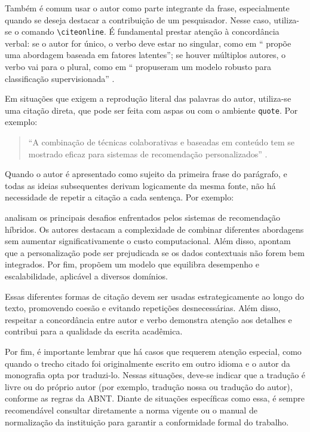 Também é comum usar o autor como parte integrante da frase, especialmente quando se deseja destacar a contribuição de um pesquisador. Nesse caso, utiliza-se o comando \verb|\citeonline|. É fundamental prestar atenção à concordância verbal: se o autor for único, o verbo deve estar no singular, como em `` propõe uma abordagem baseada em fatores latentes''; se houver múltiplos autores, o verbo vai para o plural, como em `` propuseram um modelo robusto para classificação supervisionada'' .

Em situações que exigem a reprodução literal das palavras do autor, utiliza-se uma citação direta, que pode ser feita com aspas ou com o ambiente \verb|quote|. Por exemplo:

\begin{quote}
``A combinação de técnicas colaborativas e baseadas em conteúdo tem se mostrado eficaz para sistemas de recomendação personalizados'' \cite{braida2015transforming}.
\end{quote}

Quando o autor é apresentado como sujeito da primeira frase do parágrafo, e todas as ideias subsequentes derivam logicamente da mesma fonte, não há necessidade de repetir a citação a cada sentença. Por exemplo:

 analisam os principais desafios enfrentados pelos sistemas de recomendação híbridos. Os autores destacam a complexidade de combinar diferentes abordagens sem aumentar significativamente o custo computacional. Além disso, apontam que a personalização pode ser prejudicada se os dados contextuais não forem bem integrados. Por fim, propõem um modelo que equilibra desempenho e escalabilidade, aplicável a diversos domínios.

Essas diferentes formas de citação devem ser usadas estrategicamente ao longo do texto, promovendo coesão e evitando repetições desnecessárias. Além disso, respeitar a concordância entre autor e verbo demonstra atenção aos detalhes e contribui para a qualidade da escrita acadêmica.

Por fim, é importante lembrar que há casos que requerem atenção especial, como quando o trecho citado foi originalmente escrito em outro idioma e o autor da monografia opta por traduzi-lo. Nessas situações, deve-se indicar que a tradução é livre ou do próprio autor (por exemplo, tradução nossa ou tradução do autor), conforme as regras da ABNT. Diante de situações específicas como essa, é sempre recomendável consultar diretamente a norma vigente ou o manual de normalização da instituição para garantir a conformidade formal do trabalho.

